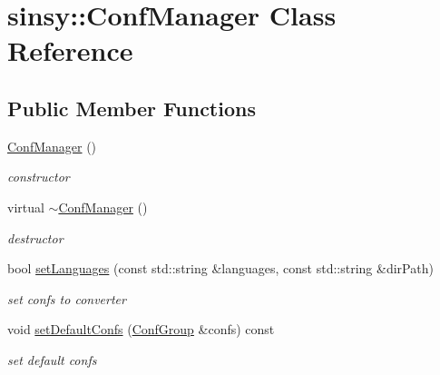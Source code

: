 \hypertarget{classsinsy_1_1ConfManager}{\section{sinsy\-:\-:\-Conf\-Manager \-Class \-Reference}
\label{classsinsy_1_1ConfManager}
}
\subsection*{\-Public \-Member \-Functions}
\begin{DoxyCompactItemize}
\item 
\hypertarget{classsinsy_1_1ConfManager_a8aeadd9e65e39448f396409a4ce942c7}{\hyperlink{classsinsy_1_1ConfManager_a8aeadd9e65e39448f396409a4ce942c7}{\-Conf\-Manager} ()}\label{classsinsy_1_1ConfManager_a8aeadd9e65e39448f396409a4ce942c7}

\begin{DoxyCompactList}\small\item\em constructor \end{DoxyCompactList}\item 
\hypertarget{classsinsy_1_1ConfManager_a6b9b153b626970bd563d290cdf5181c7}{virtual \hyperlink{classsinsy_1_1ConfManager_a6b9b153b626970bd563d290cdf5181c7}{$\sim$\-Conf\-Manager} ()}\label{classsinsy_1_1ConfManager_a6b9b153b626970bd563d290cdf5181c7}

\begin{DoxyCompactList}\small\item\em destructor \end{DoxyCompactList}\item 
bool \hyperlink{classsinsy_1_1ConfManager_a22f9ffc02ed91affdd3aef73b0f6e9ff}{set\-Languages} (const std\-::string \&languages, const std\-::string \&dir\-Path)
\begin{DoxyCompactList}\small\item\em set confs to converter \end{DoxyCompactList}\item 
\hypertarget{classsinsy_1_1ConfManager_a8554d398c696992d776d6ba28447e7f5}{void \hyperlink{classsinsy_1_1ConfManager_a8554d398c696992d776d6ba28447e7f5}{set\-Default\-Confs} (\hyperlink{classsinsy_1_1ConfGroup}{\-Conf\-Group} \&confs) const }\label{classsinsy_1_1ConfManager_a8554d398c696992d776d6ba28447e7f5}

\begin{DoxyCompactList}\small\item\em set default confs \end{DoxyCompactList}\end{DoxyCompactItemize}


